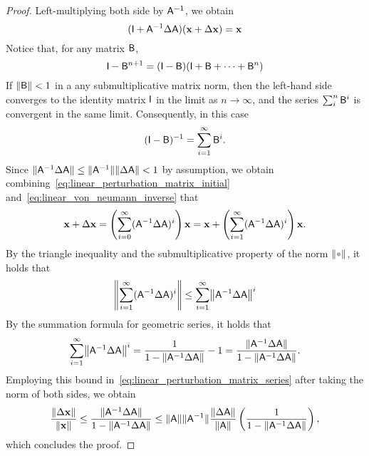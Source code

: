 \begin{proof}
    Left-multiplying both side by $\mathsf A^{-1}$,
    we obtain
    \begin{equation}
        \label{eq:linear_perturbation_matrix_initial}
        (\mathsf I + \mathsf A^{-1} \Delta \mathsf A) (\mathbf x + \Delta \mathbf x) = \mathbf x
    \end{equation}
    Notice that, for any matrix $\mathsf B$,
    \[
        \mathsf I - \mathsf B^{n+1} = (\mathsf I - \mathsf B)(\mathsf I + \mathsf B + \dotsb + \mathsf B^n)
    \]
    If $\lVert\mathsf B\rVert < 1$ in a any submultiplicative matrix norm,
    then the left-hand side converges to the identity matrix $\mathsf I$ in the limit as $n \to \infty$,
    and the series $\sum_i^n \mathsf B^i$ is convergent in the same limit.
    Consequently, in this case
    \begin{equation}
        \label{eq:linear_von_neumann_inverse}
        (\mathsf I - \mathsf B)^{-1} = \sum_{i=1}^{\infty} \mathsf B^i.
    \end{equation}
    Since $\lVert\mathsf A^{-1} \Delta \mathsf A\rVert \leq \lVert\mathsf A^{-1}\rVert \lVert\Delta \mathsf A\rVert < 1$ by assumption,
    we obtain combining~\eqref{eq:linear_perturbation_matrix_initial} and~\eqref{eq:linear_von_neumann_inverse} that
    \begin{equation}
        \label{eq:linear_perturbation_matrix_series}
         \mathbf x + \Delta \mathbf x
         = \left(\sum_{i=0}^{\infty} (\mathsf A^{-1} \Delta \mathsf A)^i \right) \mathbf x
         = \mathbf x + \left(\sum_{i=1}^{\infty} (\mathsf A^{-1} \Delta \mathsf A)^i \right) \mathbf x.
    \end{equation}
    By the triangle inequality and the submultiplicative property of the norm $\norm{\placeholder}$,
    it holds that
    \begin{align*}
        \norm*{\sum_{i=1}^{\infty} (\mat A^{-1} \Delta \mat A)^i}
        \leq \sum_{i=1}^{\infty} \norm*{\mat A^{-1} \Delta \mat A}^i
    \end{align*}
    By the summation formula for geometric series,
    it holds that
    \[
        \sum_{i=1}^{\infty} \norm*{\mat A^{-1} \Delta \mat A}^i
        = \frac{1}{1 - \norm{\mat A^{-1} \Delta \mat A}} - 1 = \frac{\norm{\mat A^{-1} \Delta \mat A}}{1 - \norm{\mat A^{-1} \Delta \mat A}}.
    \]
    Employing this bound in~\eqref{eq:linear_perturbation_matrix_series} after taking the norm of both sides,
    we obtain
    \[
        \frac{\lVert\Delta \mathbf x\rVert}{\lVert\mathbf x\rVert}
        \leq \frac{\lVert\mathsf A^{-1} \Delta \mathsf A\rVert}{1 - \lVert\mathsf A^{-1} \Delta \mathsf A\rVert}
        \leq \lVert\mathsf A\rVert \lVert\mathsf A^{-1}\rVert \frac{\lVert\Delta \mathsf A\rVert}{\lVert\mathsf A\rVert}
        \left(\frac{1}{1 - \lVert\mathsf A^{-1} \Delta \mathsf A\rVert} \right),
    \]
    which concludes the proof.
\end{proof}
